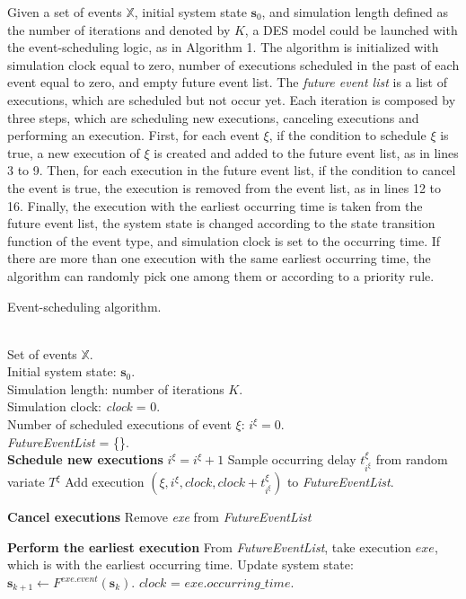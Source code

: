 \documentclass[]{interact}
\theoremstyle{plain}%
\theoremstyle{definition}
\theoremstyle{remark}
\begin{document}
Given a set of events $\mathbb{X}$, initial system state $\textbf{s}_0$, and simulation length defined as the number of iterations and denoted by $K$, a DES model could be launched with the event-scheduling logic, as in Algorithm 1. The algorithm is initialized with simulation clock equal to zero, number of executions scheduled in the past of each event equal to zero, and empty future event list. The \textit{future event list} is a list of executions, which are scheduled but not occur yet. Each iteration is composed by three steps, which are scheduling new executions, canceling executions and performing an execution. First, for each event $\xi$, if the condition to schedule $\xi$ is true, a new execution of $\xi$ is created and added to the future event list, as in lines 3 to 9. Then, for each execution in the future event list, if the condition to cancel the event is true, the execution is removed from the event list, as in lines 12 to 16. Finally, the execution with the earliest occurring time is taken from the future event list, the system state is changed according to the state transition function of the event type, and simulation clock is set to the occurring time. If there are more than one execution with the same earliest occurring time, the algorithm can randomly pick one among them or according to a priority rule.


\begin{algorithm}
	\label{algo:DES}
	\caption{Event-scheduling algorithm.}
	\begin{algorithmic}[1]
		\REQUIRE ~~\\
		Set of events $\mathbb{X}$.\\
		Initial system state: $\textbf{s}_0$.\\
		Simulation length: number of iterations $K$. \\
		Simulation clock: \textit{clock} = 0.\\
		Number of scheduled executions of event $\xi$: $i^{\xi}=0$.\\
		\textit{FutureEventList} = \{\}.\\

		
			\STATE \textbf{Schedule new executions}
					\STATE $i^{\xi} = i^{\xi}+1$
					\STATE Sample occurring delay $t^{\xi}_{i^{\xi}}$ from random variate $T^{\xi}$
					\STATE Add execution $(\xi,i^{\xi},clock,clock+t^{\xi}_{i^{\xi}})$ to \textit{FutureEventList}.
				\ENDIF
			\ENDFOR
			\STATE
			
			\STATE \textbf{Cancel executions}
					\STATE Remove \textit{exe} from \textit{FutureEventList}
				\ENDIF
			\ENDFOR
			
			\STATE
			\STATE \textbf{Perform the earliest execution}
			\STATE From \textit{FutureEventList}, take execution $exe$, which is with the earliest occurring time. 
			\STATE Update system state: $\textbf{s}_{k+1}\leftarrow F^{exe.event}(\textbf{s}_{k})$.
			\STATE $clock$ = $exe.occurring\_time$.
			
		\ENDFOR
	\end{algorithmic}
\end{algorithm}
\end{document}
